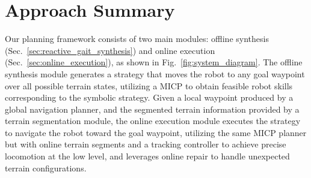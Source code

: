\documentclass[letterpaper, 10 pt, conference]{ieeeconf}
\begin{document}
\section{Approach Summary}
Our planning framework consists of two main modules: 
offline synthesis (Sec.~\ref{sec:reactive_gait_synthesis}) 
and
online execution (Sec.~\ref{sec:online_execution}), as shown in Fig.~\ref{fig:system_diagram}.
The offline synthesis module generates a strategy that moves the robot to any goal waypoint over all possible terrain states,
utilizing a MICP to obtain feasible robot skills corresponding to the symbolic strategy.
Given
a local waypoint
produced by a global navigation planner,
and the segmented terrain information
provided by a terrain segmentation module\cite{miki2022elevation},
%
the online execution module executes the strategy to navigate the robot toward the goal waypoint, 
utilizing the same MICP planner but with online terrain segments and a tracking controller
to achieve precise locomotion at the low level,
and leverages online repair 
to handle unexpected terrain configurations.



\end{document}
